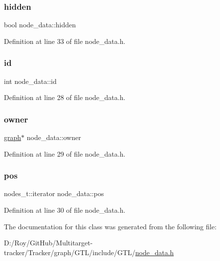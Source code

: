\subsubsection{\texorpdfstring{hidden}{hidden}}
{\footnotesize\ttfamily bool node\+\_\+data\+::hidden}



Definition at line 33 of file node\+\_\+data.\+h.

\mbox{\label{classnode__data_ac87541ac4470e3c17df808ec9a67f6c4}} 
\subsubsection{\texorpdfstring{id}{id}}
{\footnotesize\ttfamily int node\+\_\+data\+::id}



Definition at line 28 of file node\+\_\+data.\+h.

\mbox{\label{classnode__data_a20acb07c56fa28df6cbdbf3b0a02cb66}} 
\subsubsection{\texorpdfstring{owner}{owner}}
{\footnotesize\ttfamily \mbox{\hyperlink{classgraph}{graph}}$\ast$ node\+\_\+data\+::owner}



Definition at line 29 of file node\+\_\+data.\+h.

\mbox{\label{classnode__data_ab3deb00e39c12058e58a99a38507f344}} 
\subsubsection{\texorpdfstring{pos}{pos}}
{\footnotesize\ttfamily nodes\+\_\+t\+::iterator node\+\_\+data\+::pos}



Definition at line 30 of file node\+\_\+data.\+h.



The documentation for this class was generated from the following file\+:\begin{DoxyCompactItemize}
\item 
D\+:/\+Roy/\+Git\+Hub/\+Multitarget-\/tracker/\+Tracker/graph/\+G\+T\+L/include/\+G\+T\+L/\mbox{\hyperlink{node__data_8h}{node\+\_\+data.\+h}}\end{DoxyCompactItemize}
